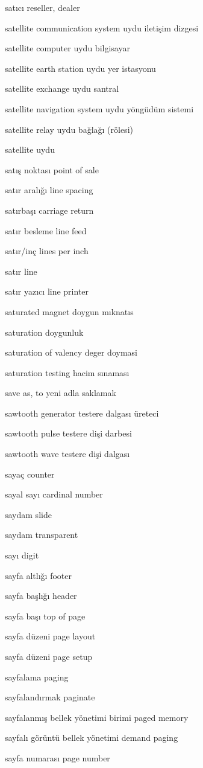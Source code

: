 \documentclass[12pt,fleqn]{article}\usepackage{../../common}
\begin{document}
satıcı reseller, dealer

satellite communication system uydu iletişim dizgesi

satellite computer uydu bilgisayar

satellite earth station uydu yer istasyonu

satellite exchange uydu santral

satellite navigation system uydu yöngüdüm sistemi

satellite relay uydu bağlağı (rölesi)

satellite uydu

satış noktası point of sale

satır aralığı line spacing

satırbaşı carriage return

satır besleme line feed

satır/inç lines per inch

satır line

satır yazıcı line printer

saturated magnet doygun mıknatıs

saturation doygunluk

saturation of valency deger doymasi

saturation testing hacim sınaması

save as, to yeni adla saklamak

sawtooth generator testere dalgası üreteci

sawtooth pulse testere dişi darbesi

sawtooth wave testere dişi dalgası

sayaç counter

sayal sayı cardinal number

saydam slide

saydam transparent

sayı digit

sayfa altlığı footer

sayfa başlığı header

sayfa başı top of page

sayfa düzeni page layout

sayfa düzeni page setup

sayfalama paging

sayfalandırmak paginate

sayfalanmış bellek yönetimi birimi paged memory

sayfalı görüntü bellek yönetimi demand paging

sayfa numarası page number
\end{document}
